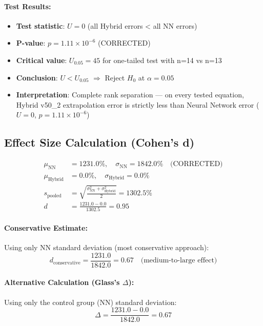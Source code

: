 \paragraph{Test Results:}
\begin{itemize}
\item \textbf{Test statistic}: $U = 0$ (all Hybrid errors < all NN errors)
\item \textbf{P-value}: $p = 1.11 \times 10^{-6}$ (CORRECTED)
\item \textbf{Critical value}: $U_{0.05} = 45$ for one-tailed test with n=14 vs n=13
\item \textbf{Conclusion}: $U < U_{0.05}$ $\Rightarrow$ Reject $H_0$ at $\alpha = 0.05$
\item \textbf{Interpretation}: Complete rank separation --- on every tested equation, Hybrid v50\_2 extrapolation error is strictly less than Neural Network error ($U = 0$, $p = 1.11 \times 10^{-6}$)
\end{itemize}

\subsection{Effect Size Calculation (Cohen's d)}

\begin{align}
\mu_{\text{NN}} &= 1231.0\%, \quad \sigma_{\text{NN}} = 1842.0\% \quad \text{(CORRECTED)} \\
\mu_{\text{Hybrid}} &= 0.0\%, \quad \sigma_{\text{Hybrid}} = 0.0\% \\
s_{\text{pooled}} &= \sqrt{\frac{\sigma_{\text{NN}}^2 + \sigma_{\text{Hybrid}}^2}{2}} = 1302.5\% \\
d &= \frac{1231.0 - 0.0}{1302.5} = 0.95
\end{align}

\paragraph{Conservative Estimate:}
Using only NN standard deviation (most conservative approach):
\begin{equation}
d_{\text{conservative}} = \frac{1231.0}{1842.0} = 0.67 \quad \text{(medium-to-large effect)}
\end{equation}

\paragraph{Alternative Calculation (Glass's $\Delta$):}
Using only the control group (NN) standard deviation:
\begin{equation}
\Delta = \frac{1231.0 - 0.0}{1842.0} = 0.67
\end{equation}
